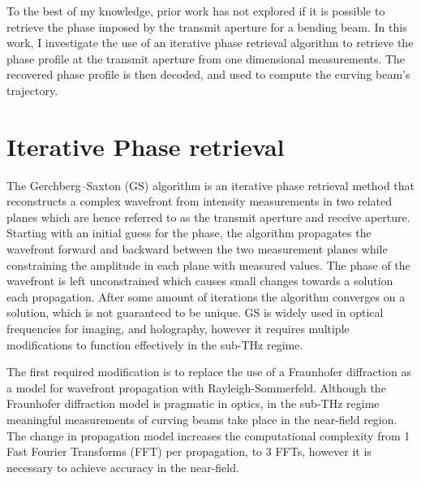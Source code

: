\documentclass[11pt]{IEEEtran}
\begin{document}
To the best of my knowledge, prior work has not explored if it is possible to retrieve the phase imposed by the transmit aperture for a bending beam. 
In this work, I investigate the use of an iterative phase retrieval algorithm to retrieve the phase profile at the transmit aperture from one dimensional measurements.
The recovered phase profile is then decoded, and used to compute the curving beam's trajectory.

\section{Iterative Phase retrieval}

The Gerchberg--Saxton (GS) algorithm is an iterative phase retrieval method that reconstructs a complex wavefront from intensity measurements in two related planes which are hence referred to as the transmit aperture and receive aperture.
Starting with an initial guess for the phase, the algorithm propagates the wavefront forward and backward between the two measurement planes while constraining the amplitude in each plane with measured values\cite{generic_mgs}.
The phase of the wavefront is left unconstrained which causes small changes towards a solution each propagation.
After some amount of iterations the algorithm converges on a solution, which is not guaranteed to be unique\cite{generic_mgs}.
GS is widely used in optical frequencies for imaging, and holography, however it requires multiple modifications to function effectively in the sub-THz regime.

The first required modification is to replace the use of a Fraunhofer diffraction as a model for wavefront propagation with Rayleigh-Sommerfeld\cite{mmwave_phase_retrieval}.
Although the Fraunhofer diffraction model is pragmatic in optics, in the sub-THz regime meaningful measurements of curving beams take place in the near-field region.
The change in propagation model increases the computational complexity from 1 Fast Fourier Transforms (FFT) per propagation, to 3 FFTs, however it is necessary to achieve accuracy in the near-field\cite{rs_impl}.
\end{document}
